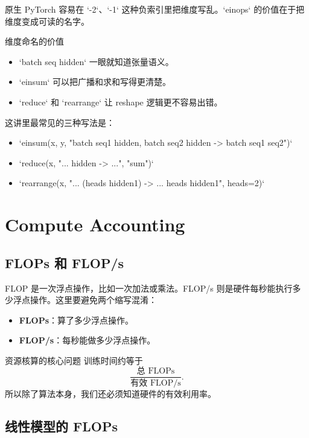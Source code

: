 \documentclass[a4paper]{article}
\begin{document}
原生 PyTorch 容易在 `-2`、`-1` 这种负索引里把维度写乱。`einops` 的价值在于把维度变成可读的名字。

\begin{knowledgebox}{维度命名的价值}
\begin{itemize}
    \item `batch seq hidden` 一眼就知道张量语义。
    \item `einsum` 可以把广播和求和写得更清楚。
    \item `reduce` 和 `rearrange` 让 reshape 逻辑更不容易出错。
\end{itemize}
\end{knowledgebox}

这讲里最常见的三种写法是：
\begin{itemize}
    \item `einsum(x, y, "batch seq1 hidden, batch seq2 hidden -> batch seq1 seq2")`
    \item `reduce(x, "... hidden -> ...", "sum")`
    \item `rearrange(x, "... (heads hidden1) -> ... heads hidden1", heads=2)`
\end{itemize}

\section{Compute Accounting}

\subsection{FLOPs 和 FLOP/s}

FLOP 是一次浮点操作，比如一次加法或乘法。FLOP/s 则是硬件每秒能执行多少浮点操作。这里要避免两个缩写混淆：

\begin{itemize}
    \item \textbf{FLOPs}：算了多少浮点操作。
    \item \textbf{FLOP/s}：每秒能做多少浮点操作。
\end{itemize}

\begin{importantbox}{资源核算的核心问题}
训练时间约等于
\[
\frac{\text{总 FLOPs}}{\text{有效 FLOP/s}}.
\]
所以除了算法本身，我们还必须知道硬件的有效利用率。
\end{importantbox}

\subsection{线性模型的 FLOPs}
\end{document}
